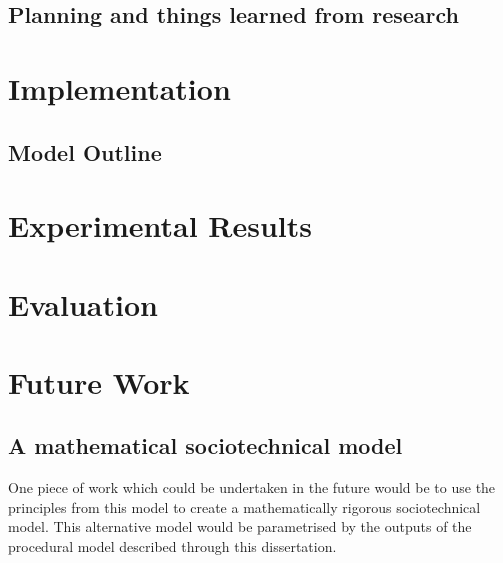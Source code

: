 \documentclass[a4paper]{l4proj}
\begin{document}
\begin{itemize}
\section{Planning and things learned from research}  %
\label{planning_head}

\chapter{Implementation}
\label{implementation_head}

\section{Model Outline}
\label{model_outline}



\chapter{Experimental Results}
\label{experimental_results}


\chapter{Evaluation}
\label{evaluation}

\chapter{Future Work}
\label{semantics}
\section{A mathematical sociotechnical model}
One piece of work which could be undertaken in the future would be to use the principles from this model to create a mathematically rigorous sociotechnical model. This alternative model would be parametrised by the outputs of the procedural model described through this dissertation. 

\end{itemize}
\end{document}
